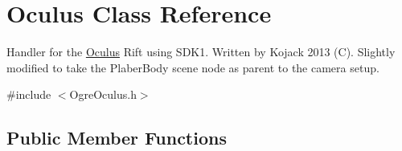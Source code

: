 \hypertarget{classOculus}{\section{\-Oculus \-Class \-Reference}
\label{classOculus}
}


\-Handler for the \hyperlink{classOculus}{\-Oculus} \-Rift using \-S\-D\-K1. \-Written by \-Kojack 2013 (\-C). \-Slightly modified to take the \-Plaber\-Body scene node as parent to the camera setup.  




{\ttfamily \#include $<$\-Ogre\-Oculus.\-h$>$}

\subsection*{\-Public \-Member \-Functions}
